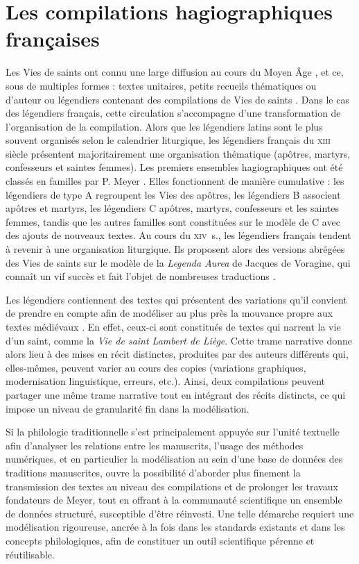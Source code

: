 \documentclass[final, fra]{anthology-ch}     %
\begin{document}
\section{Les compilations hagiographiques françaises}\label{compilationHagiographiques}

Les Vies de saints ont connu une large diffusion au cours du Moyen Âge \cite{trigalet_compter_2001}, et ce, sous de multiples formes : textes unitaires, petits recueils thématiques ou d'auteur ou légendiers contenant des compilations de Vies de saints \cite{philippart_legendiers_1977}. Dans le cas des légendiers français, cette circulation s'accompagne d'une transformation de l'organisation de la compilation. Alors que les légendiers latins sont le plus souvent organisés selon le calendrier liturgique, les légendiers français du \textsc{xiii}\ieme~ siècle présentent majoritairement une organisation thématique (apôtres, martyrs, confesseurs et saintes femmes). Les premiers ensembles hagiographiques ont été classés en familles par P. Meyer \cite{meyer_legendes_1906}. Elles fonctionnent de manière cumulative : les légendiers de type A regroupent les Vies des apôtres, les légendiers  B associent apôtres et martyrs, les légendiers C apôtres,  martyrs, confesseurs et les saintes femmes, tandis que les autres familles sont constituées sur le modèle de C avec des ajouts de nouveaux textes. Au cours du \textsc{xiv}\ieme~s., les légendiers français tendent à revenir à une organisation liturgique. Ils proposent alors des versions abrégées des Vies de saints sur le modèle de la \textit{Legenda Aurea} de Jacques de Voragine, qui connaît un vif succès et fait l'objet de nombreuses traductions \cite{fleith_saintete_2001}.

Les légendiers contiennent des textes qui présentent des variations qu'il convient de prendre en compte afin de modéliser au plus près la mouvance propre aux textes médiévaux \cite{zumthor_intertextualite_1981}. En effet, ceux-ci sont constitués de textes qui narrent la vie d'un saint, comme la \textit{Vie de saint Lambert de Liège}. Cette trame narrative donne alors lieu à des mises en récit distinctes, produites par des auteurs différents qui, elles-mêmes, peuvent varier au cours des copies (variations graphiques, modernisation linguistique, erreurs, etc.). Ainsi, deux compilations peuvent partager une même trame narrative tout en intégrant des récits distincts, ce qui impose un niveau de granularité fin dans la modélisation.

Si la philologie traditionnelle s'est principalement appuyée sur l'unité textuelle afin d'analyser les relations entre les manuscrits, l'usage des méthodes numériques, et en particulier la modélisation au sein d'une base de données des traditions manuscrites, ouvre la possibilité d'aborder plus finement la transmission des textes au niveau des compilations et de prolonger les travaux fondateurs de Meyer, tout en offrant à la communauté scientifique un ensemble de données structuré, susceptible d'être réinvesti. Une telle démarche requiert une modélisation rigoureuse, ancrée à la fois dans les standards existants et dans les concepts philologiques, afin de constituer un outil scientifique pérenne et réutilisable.
\end{document}
